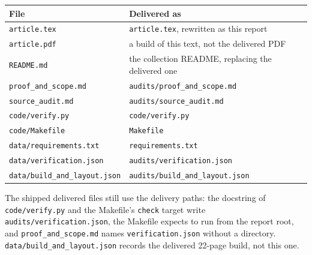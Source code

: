 \documentclass[11pt,a4paper]{article}
\numberwithin{equation}{section}
\theoremstyle{definition}
\theoremstyle{remark}
\newcommand{\rpath}[1]{\nolinkurl{#1}}%
\begin{document}
\begin{center}\small
\begin{tabular}{@{}ll@{}}
\toprule
File & Delivered as\\
\midrule
\rpath{article.tex} & \texttt{article.tex}, rewritten as this report\\
\rpath{article.pdf} & a build of this text, not the delivered PDF\\
\rpath{README.md} & the collection README, replacing the delivered one\\
\rpath{proof\_and\_scope.md} & \texttt{audits/proof\_and\_scope.md}\\
\rpath{source\_audit.md} & \texttt{audits/source\_audit.md}\\
\rpath{code/verify.py} & \texttt{code/verify.py}\\
\rpath{code/Makefile} & \texttt{Makefile}\\
\rpath{data/requirements.txt} & \texttt{requirements.txt}\\
\rpath{data/verification.json} & \texttt{audits/verification.json}\\
\rpath{data/build\_and\_layout.json} & \texttt{audits/build\_and\_layout.json}\\
\bottomrule
\end{tabular}
\end{center}

The shipped delivered files still use the delivery paths: the docstring
of \rpath{code/verify.py} and the Makefile's \texttt{check} target write
\texttt{audits/verification.json}, the Makefile expects to run from the
report root, and \rpath{proof\_and\_scope.md} names
\texttt{verification.json} without a directory.
\rpath{data/build\_and\_layout.json} records the delivered 22-page build,
not this one.
\end{document}
